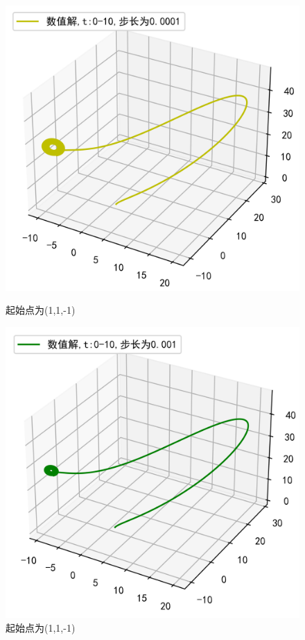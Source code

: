 \documentclass[a4paper]{article}%
\begin{document}
\begin{figure}[h]
    \begin{minipage}{0.48\linewidth}
    \centering
    \includegraphics[scale=0.65]{21}
    \caption{起始点为(1,1,-1)}
    \end{minipage}
    \begin{minipage}{0.48\linewidth}
    \centering
    \includegraphics[scale=0.65]{22}
    \caption{起始点为(1,1,-1)}
    \end{minipage}
\end{figure}
\end{document}
